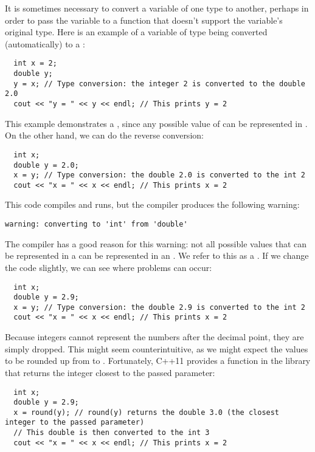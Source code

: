 
It is sometimes necessary to convert a variable of one type to another, perhaps in order to pass the variable to a function that doesn't support the variable's original type. 
Here is an example of a variable of type  being converted (automatically) to a :

\begin{lstlisting}
  int x = 2;
  double y;
  y = x; // Type conversion: the integer 2 is converted to the double 2.0
  cout << "y = " << y << endl; // This prints y = 2
\end{lstlisting}

This example demonstrates a , since any possible value of  can be represented in . 
On the other hand, we can do the reverse conversion:

\begin{lstlisting}
  int x;
  double y = 2.0;
  x = y; // Type conversion: the double 2.0 is converted to the int 2
  cout << "x = " << x << endl; // This prints x = 2
\end{lstlisting}

This code compiles and runs, but the compiler produces the following warning:

\begin{lstlisting}
warning: converting to 'int' from 'double'
\end{lstlisting}

The compiler has a good reason for this warning: not all possible values that can be represented in a  can be represented in an . 
We refer to this as a . 
If we change the code slightly, we can see where problems can occur:

\begin{lstlisting}
  int x;
  double y = 2.9;
  x = y; // Type conversion: the double 2.9 is converted to the int 2
  cout << "x = " << x << endl; // This prints x = 2
\end{lstlisting}

Because integers cannot represent the numbers after the decimal point, they are simply dropped. 
This might seem counterintuitive, as we might expect the values to be rounded up from  to . 
Fortunately, C++11 provides a  function in the  library that returns the integer closest to the passed parameter:

\begin{lstlisting}
  int x;
  double y = 2.9;
  x = round(y); // round(y) returns the double 3.0 (the closest integer to the passed parameter)
  // This double is then converted to the int 3
  cout << "x = " << x << endl; // This prints x = 2
\end{lstlisting}

